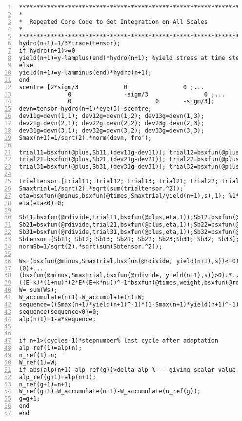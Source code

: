 \clearpage
\begin{lstlisting}[numbers=left, numberstyle=\tiny, keywordstyle=\color{blue!100}, commentstyle=\color{red!30!green!100!blue!100}, frame=shadowbox, rulesepcolor=\color{red!20!green!20!blue!20}]
***********************************************************************
*
*  Repeated Core Code to Get Integration on All Scales
*               
***********************************************************************
hydro(n+1)=1/3*trace(tensor);
if hydro(n+1)>=0
yield(n+1)=y-lamplus(end)*hydro(n+1); %yield stress at time step n+1
else
yield(n+1)=y-lamminus(end)*hydro(n+1);    
end
scentre=[2*sigm/3             0                0 ;...
              0               -sigm/3                0 ;...
              0                        0       -sigm/3];
devn=tensor-hydro(n+1)*eye(3)-scentre;
dev11g=devn(1,1); dev12g=devn(1,2); dev13g=devn(1,3);
dev21g=devn(2,1); dev22g=devn(2,2); dev23g=devn(2,3);
dev31g=devn(3,1); dev32g=devn(3,2); dev33g=devn(3,3);
Smax(n+1)=1/sqrt(2).*norm(devn,'fro');

trial11=bsxfun(@plus,Sb11,(dev11g-dev11)); trial12=bsxfun(@plus,Sb12,(dev12g-dev12));trial13=bsxfun(@plus,Sb13,(dev13g-dev13));
trial21=bsxfun(@plus,Sb21,(dev21g-dev21)); trial22=bsxfun(@plus,Sb22,(dev22g-dev22));trial23=bsxfun(@plus,Sb23,(dev23g-dev23));
trial31=bsxfun(@plus,Sb31,(dev31g-dev31)); trial32=bsxfun(@plus,Sb32,(dev32g-dev32));trial33=bsxfun(@plus,Sb33,(dev33g-dev33));

trialtensor=[trial11; trial12; trial13; trial21; trial22; trial23;trial31; trial32; trial33];
Smaxtrial=1/sqrt(2).*sqrt(sum(trialtensor.^2));
eta=bsxfun(@minus,bsxfun(@times,Smaxtrial/yield(n+1),s),1); %1*64
eta(eta<0)=0;

Sb11=bsxfun(@rdivide,trial11,bsxfun(@plus,eta,1));Sb12=bsxfun(@rdivide,trial12,bsxfun(@plus,eta,1));Sb13=bsxfun(@rdivide,trial13,bsxfun(@plus,eta,1));
Sb21=bsxfun(@rdivide,trial21,bsxfun(@plus,eta,1));Sb22=bsxfun(@rdivide,trial22,bsxfun(@plus,eta,1));Sb23=bsxfun(@rdivide,trial23,bsxfun(@plus,eta,1));
Sb31=bsxfun(@rdivide,trial31,bsxfun(@plus,eta,1));Sb32=bsxfun(@rdivide,trial32,bsxfun(@plus,eta,1));Sb33=bsxfun(@rdivide,trial33,bsxfun(@plus,eta,1));
Sbtensor=[Sb11; Sb12; Sb13; Sb21; Sb22; Sb23;Sb31; Sb32; Sb33];
normSb=1/sqrt(2).*sqrt(sum(Sbtensor.^2));

Ws=(bsxfun(@minus,Smaxtrial,bsxfun(@rdivide, yield(n+1),s))<=0).*...
(0)+...
(bsxfun(@minus,Smaxtrial,bsxfun(@rdivide, yield(n+1),s))>0).*...
((E-k)*(1+nu)*(2*E*(E+k*nu))^-1*bsxfun(@times,weight,bsxfun(@rdivide,bsxfun(@times,bsxfun(@minus,Smaxtrial,bsxfun(@rdivide, yield(n+1),s)),yield(n+1)),s)));
W= sum(Ws);
W_accumulate(n+1)=W_accumulate(n)+W;
sequence=((Smax(n+1)*yield(n+1)^-1)*(1-Smax(n+1)*yield(n+1)^-1)^-1)^fb;
sequence(sequence<0)=0;
alp(n+1)=1-a*sequence;


if n+1>(cycles-1)*stepnumber% last cycle after adaptation
alp_ref(1)=alp(n);
n_ref(1)=n;
W_ref(1)=W;
if abs(alp(n+1)-alp_ref(g))>delta_alp %----giving scalar value to iteration after the addaptation cycle(decrease time step)
alp_ref(g+1)=alp(n+1);
n_ref(g+1)=n+1;
W_ref(g+1)=W_accumulate(n+1)-W_accumulate(n_ref(g));
g=g+1;
end
end

\end{lstlisting}

